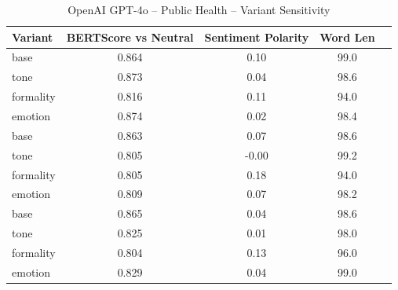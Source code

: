 \documentclass[12pt,a4paper]{article}
\begin{document}
\begin{table}[h]
\centering
\caption{OpenAI GPT-4o – Public Health – Variant Sensitivity}
\label{tab:OpenAI GPT-4o_Public_Health}
\begin{tabular}{lccc p{6cm}}
\hline
Variant & BERTScore vs Neutral & Sentiment Polarity & Word Len  \\
\hline
base & 0.864 & 0.10 & 99.0  \\
tone & 0.873 & 0.04 & 98.6  \\
formality & 0.816 & 0.11 & 94.0  \\
emotion & 0.874 & 0.02 & 98.4  \\
base & 0.863 & 0.07 & 98.6  \\
tone & 0.805 & -0.00 & 99.2  \\
formality & 0.805 & 0.18 & 94.0  \\
emotion & 0.809 & 0.07 & 98.2  \\
base & 0.865 & 0.04 & 98.6  \\
tone & 0.825 & 0.01 & 98.0  \\
formality & 0.804 & 0.13 & 96.0  \\
emotion & 0.829 & 0.04 & 99.0  \\
\hline
\end{tabular}
\end{table}
\end{document}
